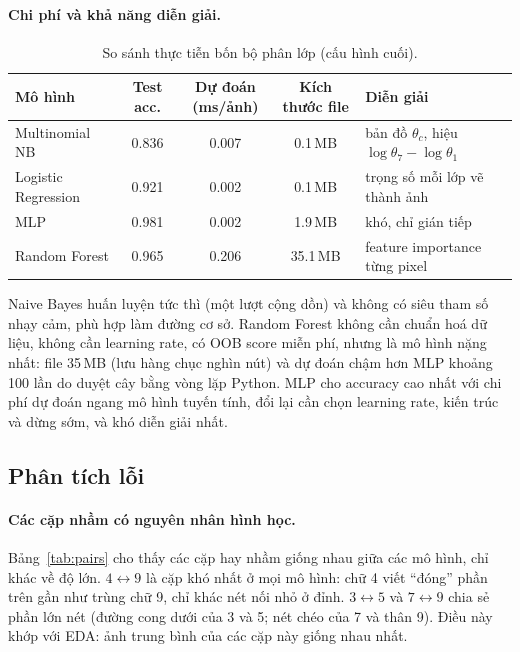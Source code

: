 \paragraph{Chi phí và khả năng diễn giải.}
\begin{table}[H]
\centering\small
\caption{So sánh thực tiễn bốn bộ phân lớp (cấu hình cuối).}\label{tab:practical}
\begin{tabular}{@{}lcccl@{}}
\toprule
Mô hình & Test acc. & Dự đoán (ms/ảnh) & Kích thước file & Diễn giải \\
\midrule
Multinomial NB      & 0.836 & 0.007 & 0.1\,MB  & bản đồ $\theta_c$, hiệu $\log\theta_7-\log\theta_1$ \\
Logistic Regression & 0.921 & 0.002 & 0.1\,MB  & trọng số mỗi lớp vẽ thành ảnh \\
MLP                 & 0.981 & 0.002 & 1.9\,MB  & khó, chỉ gián tiếp \\
Random Forest       & 0.965 & 0.206 & 35.1\,MB & feature importance từng pixel \\
\bottomrule
\end{tabular}
\end{table}
Naive Bayes huấn luyện tức thì (một lượt cộng dồn) và không có siêu tham số nhạy cảm, phù hợp làm đường cơ sở. Random Forest không cần chuẩn hoá dữ liệu, không cần learning rate, có OOB score miễn phí, nhưng là mô hình nặng nhất: file 35\,MB (lưu hàng chục nghìn nút) và dự đoán chậm hơn MLP khoảng 100 lần do duyệt cây bằng vòng lặp Python. MLP cho accuracy cao nhất với chi phí dự đoán ngang mô hình tuyến tính, đổi lại cần chọn learning rate, kiến trúc và dừng sớm, và khó diễn giải nhất.
 
\subsection{Phân tích lỗi}
 
\paragraph{Các cặp nhầm có nguyên nhân hình học.} Bảng~\ref{tab:pairs} cho thấy các cặp hay nhầm giống nhau giữa các mô hình, chỉ khác về độ lớn. $4\leftrightarrow9$ là cặp khó nhất ở mọi mô hình: chữ 4 viết ``đóng'' phần trên gần như trùng chữ 9, chỉ khác nét nối nhỏ ở đỉnh. $3\leftrightarrow5$ và $7\leftrightarrow9$ chia sẻ phần lớn nét (đường cong dưới của 3 và 5; nét chéo của 7 và thân 9). Điều này khớp với EDA: ảnh trung bình của các cặp này giống nhau nhất.
 
